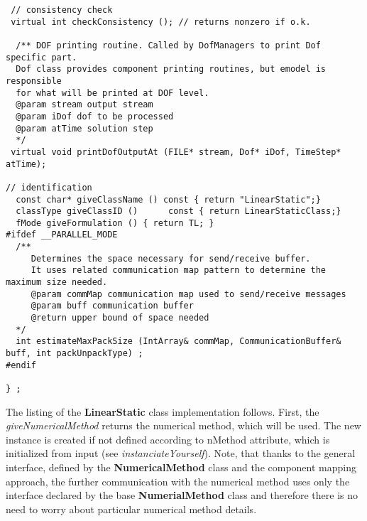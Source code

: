 \documentclass[12pt,draft]{article}
\newcommand{\class}[1]{{\bf #1}}
\newcommand{\service}[1]{{\em #1}}
\newcommand{\attribute}[1]{#1}
\begin{document}
{\begin{verbatim}
 // consistency check
 virtual int checkConsistency (); // returns nonzero if o.k.

  /** DOF printing routine. Called by DofManagers to print Dof specific part.
  Dof class provides component printing routines, but emodel is responsible
  for what will be printed at DOF level.
  @param stream output stream
  @param iDof dof to be processed
  @param atTime solution step
  */
 virtual void printDofOutputAt (FILE* stream, Dof* iDof, TimeStep* atTime);

// identification
  const char* giveClassName () const { return "LinearStatic";}
  classType giveClassID ()      const { return LinearStaticClass;}
  fMode giveFormulation () { return TL; }
#ifdef __PARALLEL_MODE
  /**
     Determines the space necessary for send/receive buffer.
     It uses related communication map pattern to determine the maximum size needed.
     @param commMap communication map used to send/receive messages
     @param buff communication buffer
     @return upper bound of space needed
  */
  int estimateMaxPackSize (IntArray& commMap, CommunicationBuffer& buff, int packUnpackType) ;
#endif
 
} ;
\end{verbatim}}

The listing of the \class{LinearStatic} class implementation follows. 
First, the \service{giveNumericalMethod} returns  the numerical method,
which will be used. The new instance is created if not defined
according to \attribute{nMethod} attribute, which is initialized from
input (see \service{instanciateYourself}). Note, that thanks to
the general interface, defined by the \class{NumericalMethod} class and the
component mapping approach, the further
communication with the numerical method uses only the interface declared by
the base \class{NumerialMethod} class and therefore there is no need to worry about
particular numerical method details. 
 
\end{document}
